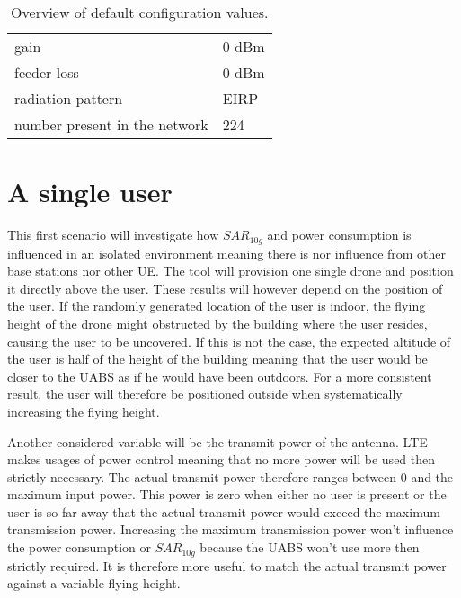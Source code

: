 \begin{table}[!htb]
\begin{tabular}[t]{ll}
        \hspace{3mm} gain                      & 0 dBm   \\ 
        \hspace{3mm} feeder loss               & 0 dBm   \\ 
        \hspace{3mm} radiation pattern         & \acs{EIRP}  \\
        \hspace{3mm} number present in the network         & 224  \\
        \toprule
\end{tabular}
\caption{Overview of default configuration values.}
\label{table:defaultconf}
\end{table}

\section{A single user}
\label{sec:s1}

This first scenario will investigate how $SAR_{10g}$ and power consumption is influenced in an isolated environment meaning there is nor influence 
from other base stations nor other \gls{UE}. The tool will provision one single drone and position it directly above the user.
These results will however depend on the position of the user. If the randomly generated location of the user is indoor, 
the flying height of the drone might obstructed by the building where the user resides, causing the user to be uncovered. If this is not the case,
the expected altitude of the user is half of the height of the building meaning that the user would be closer to the \gls{UABS} as 
if he would have been outdoors. For a more consistent result, the user will therefore be positioned outside when systematically 
increasing the flying height. 

Another considered variable will be the transmit power of the antenna.
\gls{LTE} makes usages of power control meaning that no more power will be used then strictly necessary. The actual 
transmit power therefore ranges between 0 and the maximum input power. This power is zero when either no user is 
present or the user is so far away that the actual transmit power would exceed the maximum transmission power.
Increasing the maximum transmission power won't influence the power consumption or $SAR_{10g}$ because the \gls{UABS} won't use more
then strictly required. It is therefore more useful to match the actual transmit power against a variable flying height.


